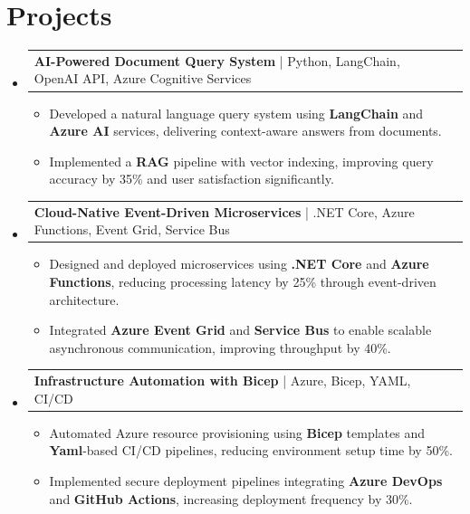 \documentclass[letterpaper,11pt]{article}
\makeatletter
\newcommand{\resumeItem}[1]{
  \item\footnotesize{
    {#1 \vspace{-2pt}}
  }
}
\newcommand{\resumeProjectHeading}[2]{
    \item
    \begin{tabular*}{1.001\textwidth}{l@{\extracolsep{\fill}}r}
      \small#1 & \textbf{\small #2}\\
    \end{tabular*}\vspace{-7pt}
}
\newcommand{\resumeSubHeadingListStart}{\begin{itemize}[leftmargin=0pt, label={}]}
\newcommand{\resumeSubHeadingListEnd}{\end{itemize}}
\newcommand{\resumeItemListStart}{\begin{itemize}[leftmargin=*]}
\newcommand{\resumeItemListEnd}{\end{itemize}\vspace{-5pt}}
\makeatother
\begin{document}
\section{Projects}
    \vspace{-5pt}
    \resumeSubHeadingListStart

      \resumeProjectHeading
          {\textbf{AI-Powered Document Query System} | Python, LangChain, OpenAI API, Azure Cognitive Services}{ }
        \resumeItemListStart
            \resumeItem{Developed a natural language query system using \textbf{LangChain} and \textbf{Azure AI} services, delivering context-aware answers from documents.}
            \resumeItem{Implemented a \textbf{RAG} pipeline with vector indexing, improving query accuracy by 35\% and user satisfaction significantly.}
        \resumeItemListEnd
        \vspace{-12pt}

      \resumeProjectHeading
          {\textbf{Cloud-Native Event-Driven Microservices} | .NET Core, Azure Functions, Event Grid, Service Bus}{ }
        \resumeItemListStart
            \resumeItem{Designed and deployed microservices using \textbf{.NET Core} and \textbf{Azure Functions}, reducing processing latency by 25\% through event-driven architecture.}
            \resumeItem{Integrated \textbf{Azure Event Grid} and \textbf{Service Bus} to enable scalable asynchronous communication, improving throughput by 40\%.}
        \resumeItemListEnd
        \vspace{-12pt}

      \resumeProjectHeading
          {\textbf{Infrastructure Automation with Bicep} | Azure, Bicep, YAML, CI/CD}{ }
        \resumeItemListStart
            \resumeItem{Automated Azure resource provisioning using \textbf{Bicep} templates and \textbf{Yaml}-based CI/CD pipelines, reducing environment setup time by 50\%.}
            \resumeItem{Implemented secure deployment pipelines integrating \textbf{Azure DevOps} and \textbf{GitHub Actions}, increasing deployment frequency by 30\%.}
        \resumeItemListEnd

    \resumeSubHeadingListEnd
\end{document}
